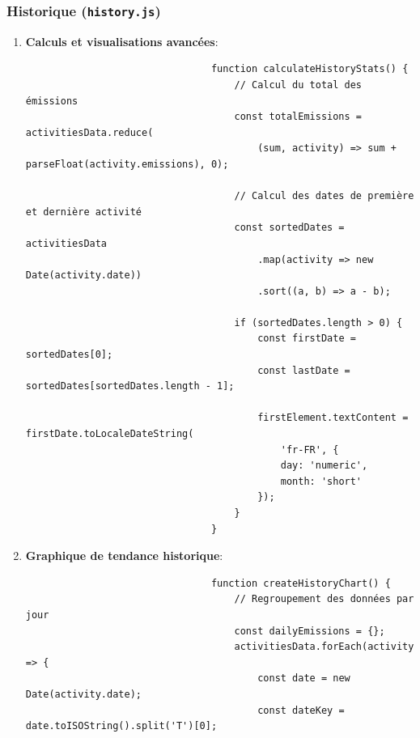 \documentclass[a4paper,11pt]{article}
\begin{document}
                \subsubsection{Historique (\texttt{history.js})}
                \begin{enumerate}
                    \item \textbf{Calculs et visualisations avancées}:
                        \begin{tcolorbox}[colback=lightgray!6, colframe=black, left=-65mm, right=5mm, top=2mm, bottom=0mm, boxrule=0.1mm]
                            \begin{verbatim}
                                function calculateHistoryStats() {
                                    // Calcul du total des émissions
                                    const totalEmissions = activitiesData.reduce(
                                        (sum, activity) => sum + parseFloat(activity.emissions), 0);
                                    
                                    // Calcul des dates de première et dernière activité
                                    const sortedDates = activitiesData
                                        .map(activity => new Date(activity.date))
                                        .sort((a, b) => a - b);

                                    if (sortedDates.length > 0) {
                                        const firstDate = sortedDates[0];
                                        const lastDate = sortedDates[sortedDates.length - 1];
                                        
                                        firstElement.textContent = firstDate.toLocaleDateString(
                                            'fr-FR', {
                                            day: 'numeric',
                                            month: 'short'
                                        });
                                    }
                                }
                            \end{verbatim}
                        \end{tcolorbox}

                    \item \textbf{Graphique de tendance historique}:
                        \begin{tcolorbox}[colback=lightgray!6, colframe=black, left=-65mm, right=5mm, top=2mm, bottom=0mm, boxrule=0.1mm]
                            \begin{verbatim}
                                function createHistoryChart() {
                                    // Regroupement des données par jour
                                    const dailyEmissions = {};
                                    activitiesData.forEach(activity => {
                                        const date = new Date(activity.date);
                                        const dateKey = date.toISOString().split('T')[0];


\end{verbatim}
\end{tcolorbox}
\end{enumerate}
\end{document}
